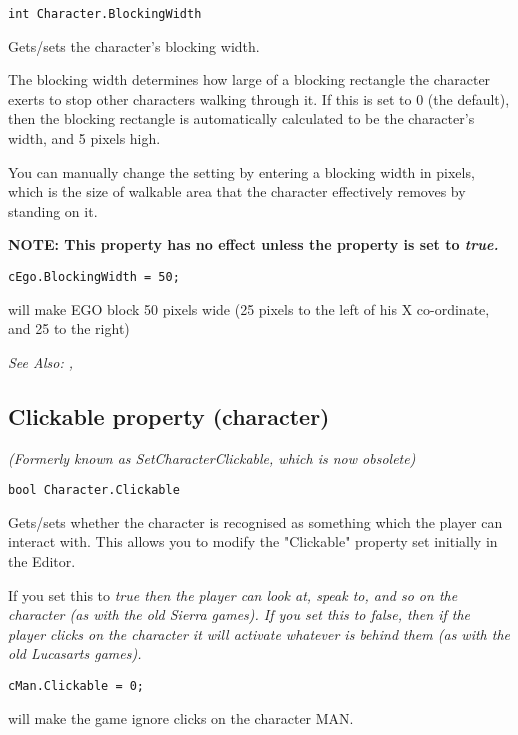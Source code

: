 \begin{verbatim}
int Character.BlockingWidth
\end{verbatim}
Gets/sets the character's blocking width.

The blocking width determines how large of a blocking rectangle the character exerts to
stop other characters walking through it. If this is set to 0 (the default), then the
blocking rectangle is automatically calculated to be the character's width, and 5 pixels
high.

You can manually change the setting by entering a blocking width in pixels, which is the
size of walkable area that the character effectively removes by standing on it.

\bf{NOTE:} This property has no effect unless the  property
is set to \it{true}.

\begin{verbatim}
cEgo.BlockingWidth = 50;
\end{verbatim}
will make EGO block 50 pixels wide (25 pixels to the left of his X co-ordinate, and 25 to the right)

\it{See Also:} ,


\subsection{Clickable property (character)}\label{Character.Clickable}%

\it{(Formerly known as SetCharacterClickable, which is now obsolete)}

\begin{verbatim}
bool Character.Clickable
\end{verbatim}
Gets/sets whether the character is recognised as something which the
player can interact with. This allows you to modify the "Clickable"
property set initially in the Editor.

If you set this to \it{true} then the player can look at, speak to, and so on
the character (as with the old Sierra games). If you set this to \it{false}, then
if the player clicks on the character it will activate whatever is behind
them (as with the old Lucasarts games).

\begin{verbatim}
cMan.Clickable = 0;
\end{verbatim}
will make the game ignore clicks on the character MAN.

